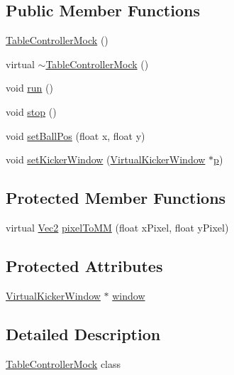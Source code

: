 \subsection*{Public Member Functions}
\begin{DoxyCompactItemize}
\item 
\hyperlink{class_table_controller_mock_a9416ad0fab277d264d587aef84dea9a6}{Table\+Controller\+Mock} ()
\item 
virtual \hyperlink{class_table_controller_mock_aa702d9abf0a9838ec8849881cc535b6a}{$\sim$\+Table\+Controller\+Mock} ()
\item 
void \hyperlink{class_table_controller_mock_a8bcca861a6459db724e544f3bcd7c1fd}{run} ()
\item 
void \hyperlink{class_table_controller_mock_a616270aef92ad4e78f90ca4c10ff0ef0}{stop} ()
\item 
void \hyperlink{class_table_controller_mock_abdfceff1485c7ad42a5d34159a27d796}{set\+Ball\+Pos} (float x, float y)
\item 
void \hyperlink{class_table_controller_mock_a4ca15421d6fe242682de756a01af719c}{set\+Kicker\+Window} (\hyperlink{class_virtual_kicker_window}{Virtual\+Kicker\+Window} $\ast$\hyperlink{jquery_8js_a2335e57f79b6acfb6de59c235dc8a83e}{p})
\end{DoxyCompactItemize}
\subsection*{Protected Member Functions}
\begin{DoxyCompactItemize}
\item 
virtual \hyperlink{class_vec2}{Vec2} \hyperlink{class_table_controller_mock_a9191e66b5b0b26f04fc71408f2516c8c}{pixel\+To\+MM} (float x\+Pixel, float y\+Pixel)
\end{DoxyCompactItemize}
\subsection*{Protected Attributes}
\begin{DoxyCompactItemize}
\item 
\hyperlink{class_virtual_kicker_window}{Virtual\+Kicker\+Window} $\ast$ \hyperlink{class_table_controller_mock_ac0605354b807b152e8c70ec8957f6ccd}{window}
\end{DoxyCompactItemize}


\subsection{Detailed Description}
\hyperlink{class_table_controller_mock}{Table\+Controller\+Mock} class 

